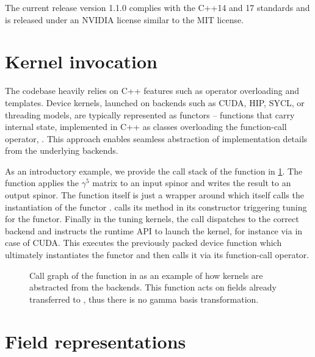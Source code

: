 The current release version 1.1.0 complies with the C++14 and 17 standards and is released under an NVIDIA license similar to the MIT license.

\section{Kernel invocation}
\label{sec:quda:kernel:invocation}

The codebase heavily relies on C++ features such as operator overloading and templates. Device kernels, launched on backends such as CUDA, HIP, SYCL, or threading models, are typically represented as functors -- functions that carry internal state, implemented in C++ as classes overloading the function-call operator, . This approach enables seamless abstraction of implementation details from the underlying backends.

As an introductory example, we provide the call stack of the function  in \cref{fig:quda:gamma5}.
The function applies the $\gamma^5$ matrix to an input spinor and writes the result to an output spinor.
The function itself is just a wrapper around  which itself calls the instantiation of the functor .
 calls its  method in its constructor triggering tuning for the  functor.
Finally in the tuning kernels, the  call dispatches to the correct backend and instructs the runtime API to launch the kernel, for instance via  in case of CUDA.
This executes the previously packed device function which ultimately instantiates the  functor and then calls it via its function-call operator.
\begin{figure}

\caption{
Call graph of the  function in \quda as an example of how kernels are abstracted from the backends.
This function acts on fields already transferred to \quda, thus there is no gamma basis transformation.
}
\label{fig:quda:gamma5}
\end{figure}

\section{Field representations}
\label{sec:quda:fields}

